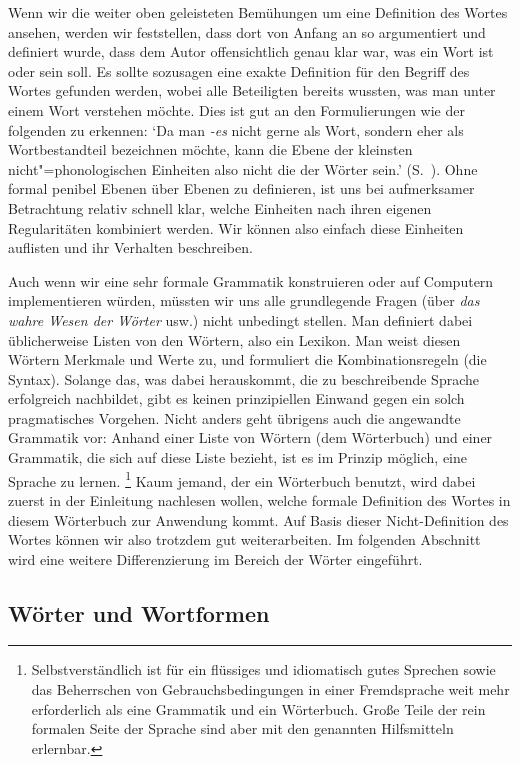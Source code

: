 Wenn wir die weiter oben geleisteten Bemühungen um eine Definition des Wortes ansehen, werden wir feststellen, dass dort von Anfang an so argumentiert und definiert wurde, dass dem Autor offensichtlich genau klar war, was ein Wort ist oder sein soll.
Es sollte sozusagen eine exakte Definition für den Begriff des Wortes gefunden werden, wobei alle Beteiligten bereits wussten, was man unter einem Wort verstehen möchte.
Dies ist gut an den Formulierungen wie der folgenden zu erkennen:
`Da man \textit{-es} nicht gerne als Wort, sondern eher als Wortbestandteil bezeichnen möchte, kann die Ebene der kleinsten nicht"=phonologischen Einheiten also nicht die der Wörter sein.' (S.~\pageref{arbref:9234645}).
Ohne formal penibel Ebenen über Ebenen zu definieren, ist uns bei aufmerksamer Betrachtung relativ schnell klar, welche Einheiten nach ihren eigenen Regularitäten kombiniert werden.
Wir können also einfach diese Einheiten auflisten und ihr Verhalten beschreiben.

Auch wenn wir eine sehr formale Grammatik konstruieren oder auf Computern implementieren würden, müssten wir uns alle grundlegende Fragen (über \textit{das wahre Wesen der Wörter} usw.) nicht unbedingt stellen.
Man definiert dabei üblicherweise Listen von den Wörtern, also ein Lexikon.
Man weist diesen Wörtern Merkmale und Werte zu, und formuliert die Kombinationsregeln (die Syntax).
Solange das, was dabei herauskommt, die zu beschreibende Sprache erfolgreich nachbildet, gibt es keinen prinzipiellen Einwand gegen ein solch pragmatisches Vorgehen.
Nicht anders geht übrigens auch die angewandte Grammatik vor:
Anhand einer Liste von Wörtern (dem Wörterbuch) und einer Grammatik, die sich auf diese Liste bezieht, ist es im Prinzip möglich, eine Sprache zu lernen.%
\footnote{Selbstverständlich ist für ein flüssiges und idiomatisch gutes Sprechen sowie das Beherrschen von Gebrauchsbedingungen in einer Fremdsprache weit mehr erforderlich als eine Grammatik und ein Wörterbuch.
Große Teile der rein formalen Seite der Sprache sind aber mit den genannten Hilfsmitteln erlernbar.}
Kaum jemand, der ein Wörterbuch benutzt, wird dabei zuerst in der Einleitung nachlesen wollen, welche formale Definition des Wortes in diesem Wörterbuch zur Anwendung kommt.
Auf Basis dieser Nicht-Definition des Wortes können wir also trotzdem gut weiterarbeiten.
Im folgenden Abschnitt wird eine weitere Differenzierung im Bereich der Wörter eingeführt.

\subsection{Wörter und Wortformen}

